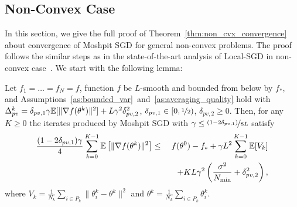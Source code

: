 \subsection{Non-Convex Case}
In this section, we give the full proof of Theorem~\ref{thm:non_cvx_convergence} about convergence of Moshpit SGD for general non-convex problems. The proof follows the similar steps as in the state-of-the-art analysis of Local-SGD in non-convex case~\cite{li2019communication,koloskova2020unified}. We start with the following lemma:
\begin{lemma}\label{lem:key_lemma_non_cvx}
    Let $f_1 = \ldots = f_N = f$, function $f$ be $L$-smooth and bounded from below by $f_*$, and Assumptions~\ref{as:bounded_var}~and~\ref{as:averaging_quality} hold with $\Delta_{pv}^k = \delta_{pv,1}\gamma\mathbb{E}[\|\nabla f(\theta^k)\|^2] + L\gamma^2\delta_{pv,2}^2$, $\delta_{pv,1}\in [0,\nicefrac{1}{2})$, $\delta_{pv,2}\ge 0$. Then, for any $K \ge 0$ the iterates produced by Moshpit SGD with $\gamma \le \nicefrac{(1-2\delta_{pv,1})}{8L}$ satisfy
    \begin{eqnarray}
         \frac{(1-2\delta_{pv,1})\gamma}{4}\sum\limits_{k=0}^{K-1}\mathbb{E}\left[\|\nabla f(\theta^k)\|^2\right] &\le& f(\theta^0) - f_* + \gamma L^2\sum\limits_{k=0}^{K-1} \mathbb{E}[V_k]\notag\\
         &&\quad + KL\gamma^2\left(\frac{\sigma^2}{N_{\min}} + \delta_{pv,2}^2\right),\label{eq:key_lemma_non_cvx}
    \end{eqnarray}
    where $V_k = \frac{1}{N_k}\sum_{i\in P_k}\|\theta_i^k - \theta^k\|^2$ and $\theta^k = \frac{1}{N_k}\sum_{i\in P_k}\theta_i^k$.
\end{lemma}
